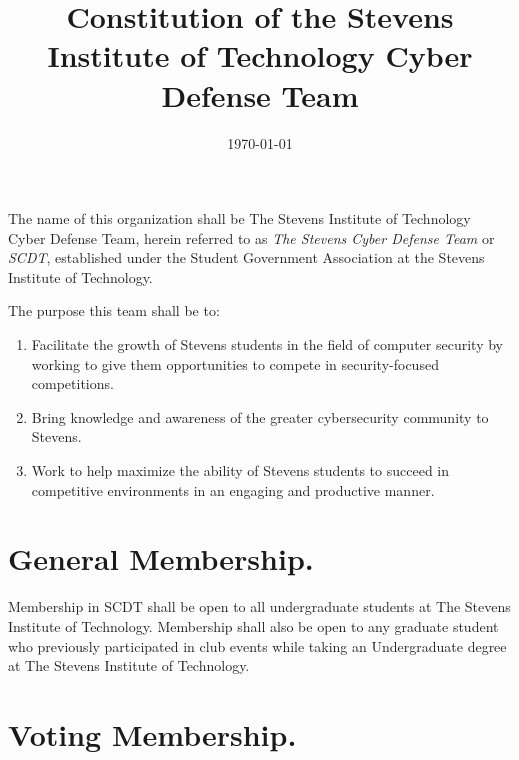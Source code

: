 \documentclass[12pt]{constitution}
\begin{document}
\title{Constitution of the Stevens Institute of Technology Cyber Defense Team}
\date{\today}
\maketitle

\newpage

\label{art:NAME}

The name of this organization shall be The Stevens Institute of Technology Cyber
Defense Team, herein referred to as \textit{The Stevens Cyber Defense Team} or
\textit{SCDT}, established under the Student Government Association at the
Stevens Institute of Technology.

\label{art:GOALS}

The purpose this team shall be to:

\begin{enumerate}
\item Facilitate the growth of Stevens students in the field of computer
  security by working to give them opportunities to compete in security-focused
  competitions.
\item Bring knowledge and awareness of the greater cybersecurity community
  to Stevens.
\item Work to help maximize the ability of Stevens students to succeed in
  competitive environments in an engaging and productive manner.
\end{enumerate}

\label{art:MEMBERSHIP}

\section{General Membership.}\label{sec:GENERAL-MEMBERSHIP}

Membership in SCDT shall be open to all undergraduate students at The Stevens
Institute of Technology. Membership shall also be open to any graduate student
who previously participated in club events while taking an Undergraduate degree
at The Stevens Institute of Technology.

\section{Voting Membership.}\label{sec:VOTING-MEMBERSHIP}
\end{document}
